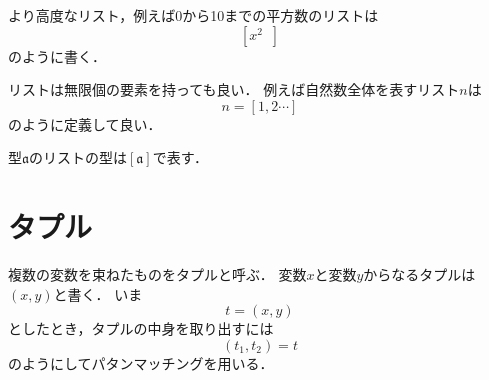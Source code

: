 \documentclass[twocolumn]{jsbook}
\newcommand{\guard}[1]{\mathop{\mid_{{#1}}}}
\begin{document}
より高度なリスト，例えば0から10までの平方数のリストは$$\left[x^2\guard{x\in[0,1\dotsb10]}\right]$$のように書く．

リストは無限個の要素を持っても良い．
例えば自然数全体を表すリスト$n$は$$n=[1,2\dotsb]$$のように定義して良い．

型$\mathfrak{a}$のリストの型は$[\mathfrak{a}]$で表す．

\section{タプル}

複数の変数を束ねたものをタプルと呼ぶ．
変数$x$と変数$y$からなるタプルは$(x,y)$と書く．
いま$$t=(x,y)$$としたとき，タプルの中身を取り出すには$$(t_1,t_2)=t$$のようにしてパタンマッチングを用いる．
\end{document}
